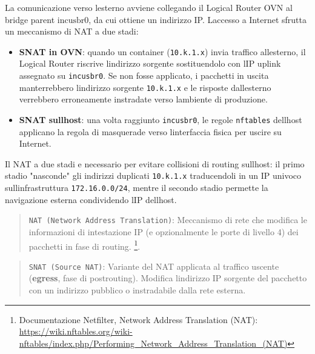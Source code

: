 La comunicazione verso l\textquotesingle esterno avviene collegando il
Logical Router OVN al bridge parent \(\text{incusbr0}\), da cui ottiene
un indirizzo IP. L\textquotesingle accesso a Internet sfrutta un
meccanismo di NAT a due stadi:

\begin{itemize}
\tightlist
\item
  \textbf{SNAT in OVN}: quando un container
  (\passthrough{\lstinline!10.k.1.x!}) invia traffico
  all\textquotesingle esterno, il Logical Router riscrive
  l\textquotesingle indirizzo sorgente sostituendolo con
  l\textquotesingle IP uplink assegnato su
  \passthrough{\lstinline!incusbr0!}. Se non fosse applicato, i
  pacchetti in uscita manterrebbero l\textquotesingle indirizzo sorgente
  \passthrough{\lstinline!10.k.1.x!} e le risposte
  dall\textquotesingle esterno verrebbero erroneamente instradate verso
  l\textquotesingle ambiente di produzione.
\item
  \textbf{SNAT sull\textquotesingle host}: una volta raggiunto
  \passthrough{\lstinline!incusbr0!}, le regole
  \passthrough{\lstinline!nftables!} dell\textquotesingle host applicano
  la regola di masquerade verso l\textquotesingle interfaccia fisica per
  uscire su Internet.
\end{itemize}

Il NAT a due stadi e\textquotesingle{} necessario per evitare collisioni
di routing sull\textquotesingle host: il primo stadio "nasconde" gli
indirizzi duplicati \passthrough{\lstinline!10.k.1.x!} traducendoli in
un IP univoco sull\textquotesingle infrastruttura
\passthrough{\lstinline!172.16.0.0/24!}, mentre il secondo stadio
permette la navigazione esterna condividendo l\textquotesingle IP
dell\textquotesingle host.

\begin{quote}
\passthrough{\lstinline!NAT (Network Address Translation)!}: Meccanismo
di rete che modifica le informazioni di intestazione IP (e opzionalmente
le porte di livello 4) dei pacchetti in fase di routing. \footnote{\label{fn:ref_20}Documentazione
  Netfilter, Network Address Translation (NAT):
  \url{https://wiki.nftables.org/wiki-nftables/index.php/Performing_Network_Address_Translation_(NAT)}}.
\end{quote}

\begin{quote}
\passthrough{\lstinline!SNAT (Source NAT)!}: Variante del NAT applicata
al traffico uscente (\textbf{egress}, fase di postrouting). Modifica
l\textquotesingle indirizzo IP sorgente del pacchetto con un indirizzo
pubblico o instradabile dalla rete esterna.
\end{quote}


